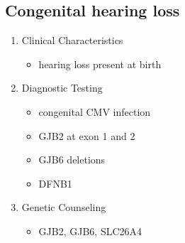 \documentclass[12pt]{scrartcl}
\begin{document}
\subsection{Congenital hearing loss}
\label{sec:orgf2a2f14}
\begin{enumerate}
\item Clinical Characteristics
\label{sec:org1cd68f6}
\begin{itemize}
\item hearing loss present at birth
\end{itemize}
\item Diagnostic Testing
\label{sec:orgb0bd464}
\begin{itemize}
\item congenital CMV infection
\item GJB2 at exon 1 and 2
\item GJB6 deletions
\item DFNB1
\end{itemize}
\item Genetic Counseling
\label{sec:org0ffa0f5}
\begin{itemize}
\item GJB2, GJB6, SLC26A4
\end{itemize}
\end{enumerate}
\end{document}
